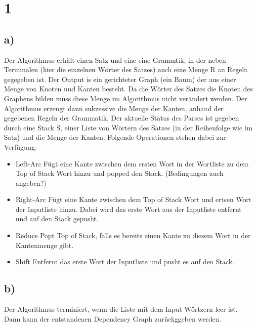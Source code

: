 \documentclass[a4paper,11pt,fleqn]{scrartcl}
\title{\titleinfo}
\author{\authorinfo}
\begin{document}
\maketitle

\section*{1}
\subsection*{a)}
Der Algorithmus erhält einen Satz und eine eine Grammtik, in der neben Terminalen (hier die einzelnen Wörter des Satzes) auch eine Menge R an Regeln gegegeben ist.
Der Output is ein gerichteter Graph (ein Baum) der aus einer Menge von Knoten und Kanten besteht. Da die Wörter des Satzes die Knoten des Graphens bilden muss diese Menge im 
Algorithmus nicht verändert werden. Der Algorithmus erzeugt dann sukzessive die Menge der Kanten, anhand der gegebenen Regeln der Grammatik.
Der aktuelle Status des Parses ist gegeben durch eine Stack S, einer Liste von Wörtern des Satzes (in der Reihenfolge wie im Satz) und die Menge der Kanten.  
Folgende Operationen stehen dabei zur Verfügung:
\begin{itemize}
 \item Left-Arc 
   Fügt eine Kante zwischen dem ersten Wort in der Wortliste zu dem Top of Stack Wort hinzu und popped den Stack. (Bedingungen auch angeben?)
 \item Right-Arc 
   Fügt eine Kante zwischen dem Top of Stack Wort und ertsen Wort der Inputliste hinzu. Dabei wird das erste Wort aus der Inputliste entfernt und auf den Stack gepusht.
 \item Reduce 
   Popt Top of Stack, falls es bereits einen Kante zu diesem Wort in der Kantenmenge gibt.  
 \item Shift 
   Entfernt das erste Wort der Inputliste und pusht es auf den Stack.
\end{itemize}
\subsection*{b)}
Der Algorithmus terminiert, wenn die Liste mit dem Input Wörtzern leer ist. Dann kann der entstandenen Dependency Graph zurückggeben werden. 
\end{document}
